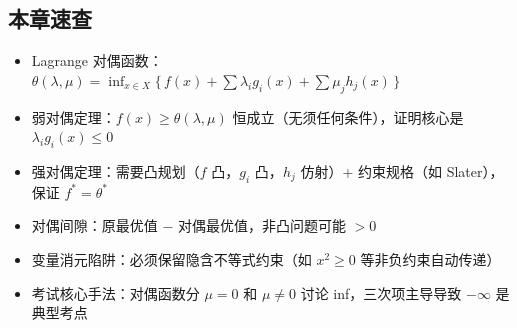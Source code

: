 \clearpage\subsection{本章速查}

\begin{itemize}
  \item Lagrange 对偶函数：$\theta(\lambda,\mu) = \inf_{x\in X} \{\,f(x) + \sum\lambda_i g_i(x) + \sum\mu_j h_j(x)\,\}$
  \item 弱对偶定理：$f(x) \ge \theta(\lambda,\mu)$ 恒成立（无须任何条件），证明核心是 $\lambda_i g_i(x) \le 0$
  \item 强对偶定理：需要凸规划（$f$ 凸，$g_i$ 凸，$h_j$ 仿射）+ 约束规格（如 Slater），保证 $f^* = \theta^*$
  \item 对偶间隙：原最优值 $-$ 对偶最优值，非凸问题可能 $>0$
  \item 变量消元陷阱：必须保留隐含不等式约束（如 $x^2 \ge 0$ 等非负约束自动传递）
  \item 考试核心手法：对偶函数分 $\mu=0$ 和 $\mu\neq0$ 讨论 inf，三次项主导导致 $-\infty$ 是典型考点
\end{itemize}
